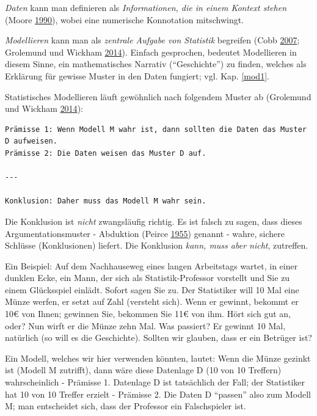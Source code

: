 \documentclass[12pt,ngerman,]{book}
\newcommand{\euro}{€}
\begin{document}
\emph{Daten} kann man definieren als \emph{Informationen, die in einem
Kontext stehen} (Moore
\protect\hyperlink{ref-moore1990uncertainty}{1990}), wobei eine
numerische Konnotation mitschwingt.

\emph{Modellieren} kann man als \emph{zentrale Aufgabe von Statistik}
begreifen (Cobb \protect\hyperlink{ref-cobb2007introductory}{2007};
Grolemund und Wickham
\protect\hyperlink{ref-grolemund2014cognitive}{2014}). Einfach
gesprochen, bedeutet Modellieren in diesem Sinne, ein mathematisches
Narrativ (``Geschichte'') zu finden, welches als Erklärung für gewisse
Muster in den Daten fungiert; vgl. Kap. \ref{mod1}.

Statistisches Modellieren läuft gewöhnlich nach folgendem Muster ab
(Grolemund und Wickham
\protect\hyperlink{ref-grolemund2014cognitive}{2014}):

\begin{verbatim}
Prämisse 1: Wenn Modell M wahr ist, dann sollten die Daten das Muster D aufweisen.
Prämisse 2: Die Daten weisen das Muster D auf.

---

Konklusion: Daher muss das Modell M wahr sein.
\end{verbatim}

Die Konklusion ist \emph{nicht} zwangsläufig richtig. Es ist falsch zu
sagen, dass dieses Argumentationsmuster - Abduktion (Peirce
\protect\hyperlink{ref-peirce1955abduction}{1955}) genannt - wahre,
sichere Schlüsse (Konklusionen) liefert. Die Konklusion \emph{kann, muss
aber nicht}, zutreffen.

Ein Beispiel: Auf dem Nachhauseweg eines langen Arbeitstags wartet, in
einer dunklen Ecke, ein Mann, der sich als Statistik-Professor vorstellt
und Sie zu einem Glücksspiel einlädt. Sofort sagen Sie zu. Der
Statistiker will 10 Mal eine Münze werfen, er setzt auf Zahl (versteht
sich). Wenn er gewinnt, bekommt er 10\euro{} von Ihnen; gewinnen Sie,
bekommen Sie 11\euro{} von ihm. Hört sich gut an, oder? Nun wirft er die
Münze zehn Mal. Was passiert? Er gewinnt 10 Mal, natürlich (so will es
die Geschichte). Sollten wir glauben, dass er ein Betrüger ist?

Ein Modell, welches wir hier verwenden könnten, lautet: Wenn die Münze
gezinkt ist (Modell M zutrifft), dann wäre diese Datenlage D (10 von 10
Treffern) wahrscheinlich - Prämisse 1. Datenlage D ist tatsächlich der
Fall; der Statistiker hat 10 von 10 Treffer erzielt - Prämisse 2. Die
Daten D ``passen'' also zum Modell M; man entscheidet sich, dass der
Professor ein Falschspieler ist.
\end{document}
